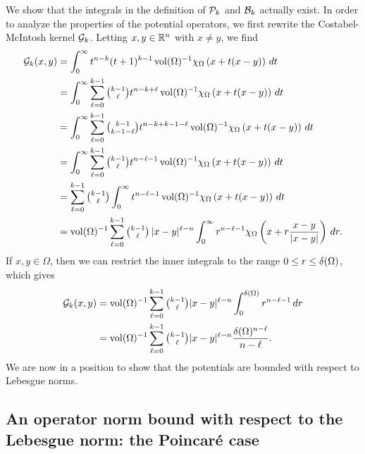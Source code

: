 \documentclass[10pt,letterpaper]{article}
\newcommand\cye[1]{%
\protect\leavevmode
\begingroup
    \color{red!35!yellow}%
    #1%
\endgroup
}
\begin{document}
We show that the integrals in the definition of ${\mathcal P}_{k}$ and ${\mathcal B}_{k}$ actually exist. 
In order to analyze the properties of the potential operators,
we first rewrite the Costabel-McIntosh kernel ${\mathcal G}_{k}$.
Letting $x,y \in {\mathbb R}^n$ with $x \neq y$, we find 
\begin{align*}
    {\mathcal G}_{k}(x,y) 
    &= 
    \int_{0}^{\infty} t^{n-k} (t+1)^{k-1} \operatorname{vol}(\Omega)^{-1} \chi_{\Omega} \left( x+t(x-y) \right)\,dt
    \\
    &= 
    \int_{0}^{\infty} \sum_{\ell=0}^{k-1} \tbinom{k-1}{\ell} t^{n-k+\ell} \operatorname{vol}(\Omega)^{-1} \chi_{\Omega} \left( x+t(x-y) \right)\,dt
    \\
    &= 
    \int_{0}^{\infty} \sum_{\ell=0}^{k-1} \tbinom{k-1}{k-1-\ell} t^{n-k+k-1-\ell} \operatorname{vol}(\Omega)^{-1} \chi_{\Omega} \left( x+t(x-y) \right)\,dt
    \\
    &= 
    \int_{0}^{\infty} \sum_{\ell=0}^{k-1} \tbinom{k-1}{\ell} t^{n-\ell-1} \operatorname{vol}(\Omega)^{-1} \chi_{\Omega} \left( x+t(x-y) \right)\,dt
    \\
    &= 
    \sum_{\ell=0}^{k-1} \tbinom{k-1}{\ell} \int_{0}^{\infty} t^{n-\ell-1} \operatorname{vol}(\Omega)^{-1} \chi_{\Omega}\left( x+t(x-y) \right)\,dt 
    \\
    &= 
    \operatorname{vol}(\Omega)^{-1} \sum_{\ell=0}^{k-1} \tbinom{k-1}{\ell} \, |x-y|^{\ell-n} \int_{0}^{\infty} r^{n-\ell-1} \chi_{\Omega}\left(x+r\frac{x-y}{|x-y|}\right)\,dr
    .
\end{align*}
If $x, y \in \Omega$, then we can restrict the inner integrals to the range $0 \leq r \leq {\delta}(\Omega)$, which gives 
\begin{align*}
    {\mathcal G}_{k}(x,y) 
    &= 
    \operatorname{vol}(\Omega)^{-1} \sum_{\ell=0}^{k-1}\tbinom{k-1}{\ell} |x-y|^{\ell-n} \int_{0}^{{\delta}(\Omega)} r^{n-\ell-1} \,dr 
    \\
    &= 
    \operatorname{vol}(\Omega)^{-1} \sum_{\ell=0}^{k-1}\tbinom{k-1}{\ell} |x-y|^{\ell-n} \frac{ {\delta}(\Omega)^{n-\ell} }{n-\ell}.
\end{align*}
We are now in a position to show that the potentials are bounded with respect to Lebesgue norms. 

\subsection{\cye{An operator norm bound with respect to the Lebesgue norm: the Poincar\'e case}}
\end{document}
